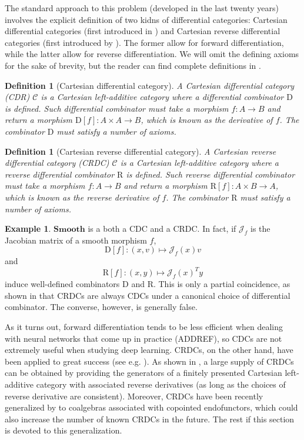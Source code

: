 \documentclass[11pt,a4paper,openright,twoside]{report}
\theoremstyle{plain}
\newtheorem{definition}[proposition]{Definition}
\theoremstyle{definition}
\newtheorem{example}[proposition]{Example}
\begin{document}
The standard approach to this problem (developed in the last twenty years) involves the explicit definition of two kidns of differential categories: Cartesian differential categories (first introduced in \cite{blute2006differential}) and Cartesian reverse differential categories (first introduced by \cite{cockett2019reverse}). The former allow for forward differentiation, while the latter allow for reverse differentiation. We will omit the defining axioms for the sake of brevity, but the reader can find complete definitions in \cite{cockett2019reverse}.

\begin{definition}[Cartesian differential category]
  A Cartesian differential category (CDR) $\mathcal{C}$ is a Cartesian left-additive category where a differential combinator $\mathrm{D}$ is defined. Such differential combinator must take a morphism $f: A \to B$ and return a morphism $\mathrm{D}[f]: A \times A \to B$, which is known as the derivative of $f$. The combinator $\mathrm{D}$ must satisfy a number of axioms. 
\end{definition}

\begin{definition}[Cartesian reverse differential category]
  A Cartesian reverse differential category (CRDC) $\mathcal{C}$ is a Cartesian left-additive category where a reverse differential combinator $\mathrm{R}$ is defined. Such reverse differential combinator must take a morphism $f: A \to B$ and return a morphism $\mathrm{R}[f]: A \times B \to A$, which is known as the reverse derivative of $f$. The combinator $\mathrm{R}$ must satisfy a number of axioms. 
\end{definition}

\begin{example}
  $\mathbf{Smooth}$ is a both a CDC and a CRDC. In fact, if $\mathcal{J}_f$ is the Jacobian matrix of a smooth morphism $f$,
  \[\mathrm{D}[f]: (x,v) \mapsto \mathcal{J}_f(x)v\]
  and
  \[\mathrm{R}[f]: (x,y) \mapsto \mathcal{J}_f(x)^Ty\]
  induce well-defined combinators $\mathrm{D}$ and $\mathrm{R}$. This is only a partial coincidence, as shown in \cite{cockett2019reverse} that CRDCs are always CDCs under a canonical choice of differential combinator. The converse, however, is generally false.
\end{example}


As it turns out, forward differentiation tends to be less efficient when dealing with neural networks that come up in practice (ADDREF), so CDCs are not extremely useful when studying deep learning. CRDCs, on the other hand, have been applied to great success (see e.g. \cite{cruttwell2022categorical}). As shown in \cite{wilson2022categories}, a large supply of CRDCs can be obtained by providing the generators of a finitely presented Cartesian left-additive category with associated reverse derivatives (as long as the choices of reverse derivative are consistent).
Moreover, CRDCs have been recently generalized by \cite{gavranovic2024fundamental} to coalgebras associated with copointed endofunctors, which could also increase the number of known CRDCs in the future. The rest if this section is devoted to this generalization.
\end{document}
